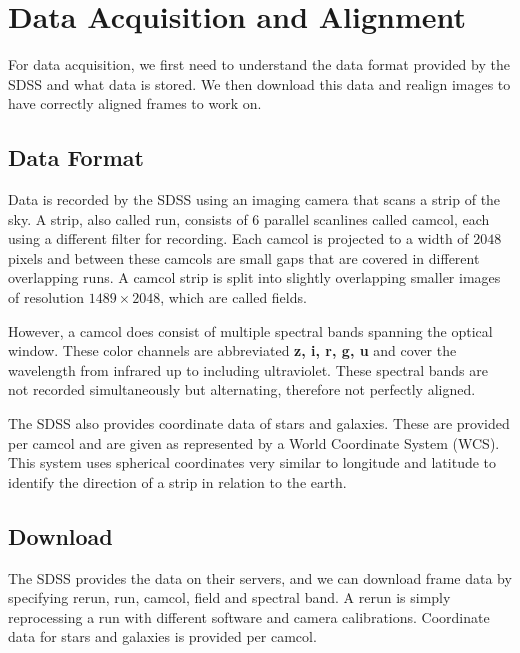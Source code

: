 \documentclass[
a4paper,     %
10pt         %
]{scrartcl}  %
\begin{document}
\section{Data Acquisition and Alignment}
For data acquisition, we first need to understand the data format provided by the SDSS and what data is stored.
We then download this data and realign images to have correctly aligned frames to work on.

\subsection{Data Format}
Data is recorded by the SDSS using an imaging camera that scans a strip of the sky.
A strip, also called run, consists of 6 parallel scanlines called camcol, each using a different filter for recording.
Each camcol is projected to a width of $2048$ pixels and between these camcols are small gaps that are covered in different overlapping runs.
A camcol strip is split into slightly overlapping smaller images of resolution $1489\times 2048$, which are called fields.

However, a camcol does consist of multiple spectral bands spanning the optical window.
These color channels are abbreviated \textbf{z, i, r, g, u} and cover the wavelength from infrared up to including ultraviolet.
These spectral bands are not recorded simultaneously but alternating, therefore not perfectly aligned.

The SDSS also provides coordinate data of stars and galaxies.
These are provided per camcol and are given as represented by a World Coordinate System (WCS).
This system uses spherical coordinates very similar to longitude and latitude to identify the direction of a strip in relation to the earth.

\subsection{Download}
The SDSS provides the data on their servers, and we can download frame data by specifying rerun, run, camcol, field and spectral band.
A rerun is simply reprocessing a run with different software and camera calibrations.
Coordinate data for stars and galaxies is provided per camcol.
\end{document}
